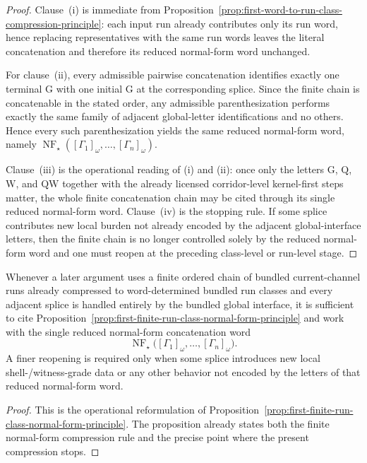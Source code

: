 \begin{proof}
Clause~(i) is immediate from Proposition~\ref{prop:first-word-to-run-class-compression-principle}: each input run already contributes only its run word, hence replacing representatives with the same run words leaves the literal concatenation and therefore its reduced normal-form word unchanged.

For clause~(ii), every admissible pairwise concatenation identifies exactly one terminal $\mathrm G$ with one initial $\mathrm G$ at the corresponding splice. Since the finite chain is concatenable in the stated order, any admissible parenthesization performs exactly the same family of adjacent global-letter identifications and no others. Hence every such parenthesization yields the same reduced normal-form word, namely \(\operatorname{NF}_{\star}([\Gamma_1]_{\omega},\dots,[\Gamma_n]_{\omega})\).

Clause~(iii) is the operational reading of (i) and (ii): once only the letters $\mathrm G$, $\mathrm Q$, $\mathrm W$, and $\mathrm{QW}$ together with the already licensed corridor-level kernel-first steps matter, the whole finite concatenation chain may be cited through its single reduced normal-form word. Clause~(iv) is the stopping rule. If some splice contributes new local burden not already encoded by the adjacent global-interface letters, then the finite chain is no longer controlled solely by the reduced normal-form word and one must reopen at the preceding class-level or run-level stage.
\end{proof}

\begin{corollary}
\label{cor:use-rule-for-the-first-finite-run-class-normal-form-principle}
Whenever a later argument uses a finite ordered chain of bundled current-channel runs already compressed to word-determined bundled run classes and every adjacent splice is handled entirely by the bundled global interface, it is sufficient to cite Proposition~\ref{prop:first-finite-run-class-normal-form-principle} and work with the single reduced normal-form concatenation word
\[
\operatorname{NF}_{\star}\bigl([\Gamma_1]_{\omega},\dots,[\Gamma_n]_{\omega}\bigr).
\]
A finer reopening is required only when some splice introduces new local shell-/witness-grade data or any other behavior not encoded by the letters of that reduced normal-form word.
\end{corollary}

\begin{proof}
This is the operational reformulation of Proposition~\ref{prop:first-finite-run-class-normal-form-principle}. The proposition already states both the finite normal-form compression rule and the precise point where the present compression stops.
\end{proof}


